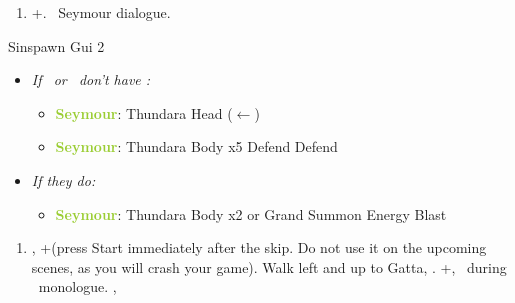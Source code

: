 \begin{enumerate}[resume]
	\item \cs+\skippablefmv[2:20]. \sd\ Seymour dialogue.
\end{enumerate}
\begin{battle}[6000]{Sinspawn Gui 2}
	\begin{itemize}
		\item \textit{If \yuna\ or \valefor\ don't have \od:}
		      \begin{itemize}
			      \item \textbf{\textcolor{YellowGreen}{Seymour}}: Thundara Head ($\leftarrow$)
			      \item \textbf{\textcolor{YellowGreen}{Seymour}}: Thundara Body x5
			            \yunaf Defend
			            \auronf Defend
		      \end{itemize}
		\item \textit{If they do:}
		      \begin{itemize}
			      \item \textbf{\textcolor{YellowGreen}{Seymour}}: Thundara Body x2
			            \summon{\valefor} or Grand Summon \valefor
			            \valeforf Energy Blast
		      \end{itemize}
	\end{itemize}
\end{battle}
\begin{enumerate}[resume]
	\item \sd, \cs+\skippablefmv[2:00] (press Start immediately after the skip. Do not use it on the upcoming scenes, as you will crash your game). Walk left and up to Gatta, \sd. \fmv+\cs[1:30], \sd\ during \tidus\ monologue. \cs[1:00], \sd
\end{enumerate}
